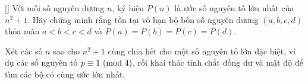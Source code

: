 \documentclass[../02-modular-arithmetic-b.tex]{subfiles}
\begin{document}
\begin{exercise*}\label{example:HUN-2015-TST-KMA-643}[\textbf{}]
    Với mỗi số nguyên dương \( n \), ký hiệu \( P(n) \) là ước số nguyên tố lớn nhất của \( n^2 + 1 \).
    Hãy chứng minh rằng tồn tại vô hạn bộ bốn số nguyên dương \( (a, b, c, d) \) thỏa mãn \( a < b < c < d \) và \( P(a) = P(b) = P(c) = P(d) \).
\end{exercise*}

\begin{remark*}
    Xét các số \( n \) sao cho \( n^2 + 1 \) cùng chia hết cho một số nguyên tố lớn đặc biệt, ví dụ các số nguyên tố \( p \equiv 1 \ (\mathrm{mod}\ 4) \),
    rồi khai thác tính chất đồng dư và mật độ để tìm các bộ có cùng ước lớn nhất.
\end{remark*}

    
\end{document}
